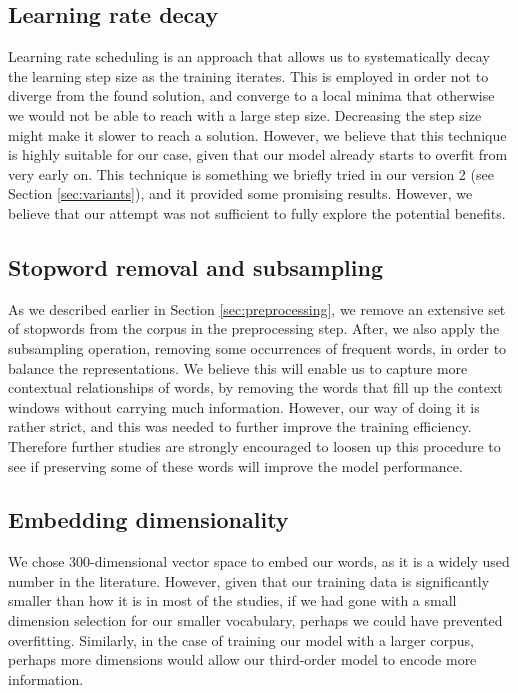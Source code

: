 \subsection{Learning rate decay}
Learning rate scheduling is an approach that allows us to systematically decay the learning step size as the training iterates. This is employed in order not to diverge from the found solution, and converge to a local minima that otherwise we would not be able to reach with a large step size. Decreasing the step size might make it slower to reach a solution. However, we believe that this technique is highly suitable for our case, given that our model already starts to overfit from very early on. This technique is something we briefly tried in our version 2 (see Section \ref{sec:variants}), and it provided some promising results. However, we believe that our attempt was not sufficient to fully explore the potential benefits.

\subsection{Stopword removal and subsampling}
As we described earlier in Section \ref{sec:preprocessing}, we remove an extensive set of stopwords from the corpus in the preprocessing step. After, we also apply the subsampling operation, removing some occurrences of frequent words, in order to balance the representations. We believe this will enable us to capture more contextual relationships of words, by removing the words that fill up the context windows without carrying much information. However, our way of doing it is rather strict, and this was needed to further improve the training efficiency. Therefore further studies are strongly encouraged to loosen up this procedure to see if preserving some of these words will improve the model performance.

\subsection{Embedding dimensionality}
We chose 300-dimensional vector space to embed our words, as it is a widely used number in the literature. However, given that our training data is significantly smaller than how it is in most of the studies, if we had gone with a small dimension selection for our smaller vocabulary, perhaps we could have prevented overfitting. Similarly, in the case of training our model with a larger corpus, perhaps more dimensions would allow our third-order model to encode more information.

